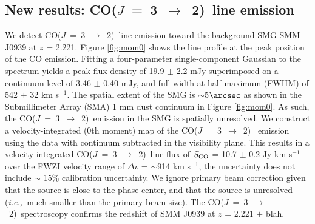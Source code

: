 \documentclass[twocolumn,apj,numberedappendix]{emulateapj}
\newcommand{\CO}{\mbox{CO($J$ = 3 $\rightarrow$ 2) }}
\newcommand{\ie}{{\sl i.e.,~}}
\newcommand{\pmOne}{$^{-1}$}
\begin{document}
\subsection{New results: \CO line emission}
We detect \CO line emission toward the background SMG SMM J0939 at $z$ = 2.221. Figure \ref{fig:mom0} shows the line profile at the peak position of the CO emission. Fitting a four-parameter single-component Gaussian to the spectrum yields a peak flux density of 19.9 $\pm
$ 2.2 mJy superimposed on a continuum level of 3.46 $\pm$ 0.40 mJy, and full width at half-maximum (FWHM) of 542 $\pm$ 32 km s\pmOne. 
The spatial extent of the SMG is $\sim$5$\arcsec$ as shown in the Submillimeter Array (SMA) 1 mm dust continuum in Figure \ref{fig:mom0}. As such, the \CO emission in the SMG is spatially unresolved. We construct a velocity-integrated (0th moment) map of the \CO 
emission using the data with continuum subtracted in the visibility plane. This results in a velocity-integrated \CO line flux of $S_{\rm CO}$ = 10.7 $\pm$ 0.2 Jy km s\pmOne over the FWZI velocity range of $\Delta v$ = $\sim$914 km s\pmOne, the uncertainty does not include $\sim$ 15\% calibration uncertainty. We ignore primary beam correction given that the source is close to the phase center, and that the source is unresolved (\ie much smaller than the primary beam size). The \CO spectroscopy confirms the redshift of SMM J0939 at $z$ = 2.221 $\pm$ blah.
\end{document}

